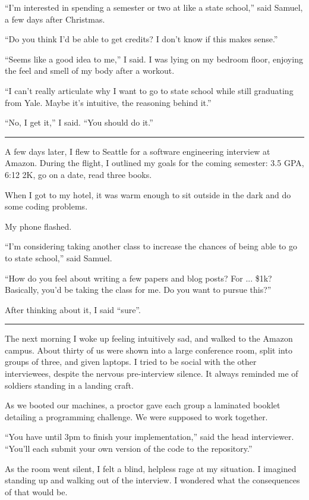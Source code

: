 ``I'm interested in spending a semester or two at like a state school,'' said
Samuel, a few days after Christmas.  

``Do you think I'd be able to get credits?  I don't know if this makes sense.''

``Seems like a good idea to me,'' I said.  I was lying on my bedroom floor,
enjoying the feel and smell of my body after a workout.  

``I can't really articulate why I want to go to state school while still
graduating from Yale.   Maybe it's intuitive, the reasoning behind it.'' 

``No, I get it,'' I said. ``You should do it.''

\plainfancybreak{12pt}{2}{* * *}

A few days later, I flew to Seattle for a software engineering interview at
Amazon.  During the flight, I outlined my goals for the coming semester: 3.5 GPA,
6:12 2K, go on a date, read three books.

When I got to my hotel, it was warm enough to sit outside in the dark and do
some coding problems. 

My phone flashed.

``I'm considering taking another class to increase the chances of being able to
go to state school,'' said Samuel.  

``How do you feel about writing a few papers and blog posts?  For ... \$1k?
Basically, you'd be taking the class for me.  Do you want to pursue this?'' 

After thinking about it, I said ``sure''.

\plainfancybreak{12pt}{2}{* * *}

The next morning I woke up feeling intuitively sad, and walked to the Amazon
campus.  About thirty of us were shown into a large conference room, split into
groups of three, and given laptops.  I tried to be social with the other
interviewees, despite the nervous pre-interview silence.  It always reminded me
of soldiers standing in a landing craft.

As we booted our machines, a proctor gave each group a laminated booklet
detailing a programming challenge.  We were supposed to work together.

``You have until 3pm to finish your implementation,'' said the head interviewer.
``You'll each submit your own version of the code to the repository.''

As the room went silent, I felt a blind, helpless rage at my situation.  I
imagined standing up and walking out of the interview.  I wondered what the
consequences of that would be.  

